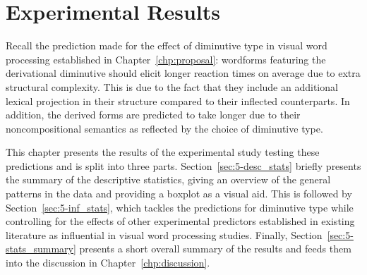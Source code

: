 \chapter{Experimental Results}\label{chp:results}
Recall the prediction made for the effect of diminutive type in visual word processing established in Chapter~\ref{chp:proposal}: wordforms featuring the derivational diminutive should elicit longer reaction times on average due to extra structural complexity. This is due to the fact that they include an additional lexical projection in their structure compared to their inflected counterparts. In addition, the derived forms are predicted to take longer due to their noncompositional semantics as reflected by the choice of diminutive type.

This chapter presents the results of the experimental study testing these predictions and is split into three parts. Section~\ref{sec:5-desc_stats} briefly presents the summary of the descriptive statistics, giving an overview of the general patterns in the data and providing a boxplot as a visual aid. This is followed by Section~\ref{sec:5-inf_stats}, which tackles the predictions for diminutive type while controlling for the effects of other experimental predictors established in existing literature as influential in visual word processing studies. Finally, Section~\ref{sec:5-stats_summary} presents a short overall summary of the results and feeds them into the discussion in Chapter~\ref{chp:discussion}.

